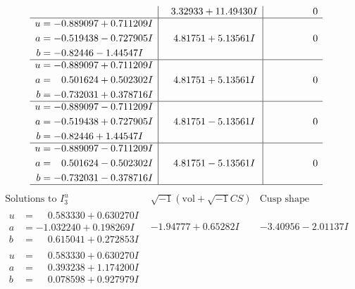 \documentclass[1p]{elsarticle_modified}
\theoremstyle{definition}
\newcommand{\I}{\sqrt{-1}}
\begin{document}
$$\begin{array}{c|c|c}
 & \phantom{-}3.32933 + 11.49430 I & \phantom{-0.000000 } 0 \\ \hline\begin{aligned}
u &= -0.889097 + 0.711209 I \\
a &= -0.519438 - 0.727905 I \\
b &= -0.82446 - 1.44547 I\end{aligned}
 & \phantom{-}4.81751 + 5.13561 I & \phantom{-0.000000 } 0 \\ \hline\begin{aligned}
u &= -0.889097 + 0.711209 I \\
a &= \phantom{-}0.501624 + 0.502302 I \\
b &= -0.732031 + 0.378716 I\end{aligned}
 & \phantom{-}4.81751 + 5.13561 I & \phantom{-0.000000 } 0 \\ \hline\begin{aligned}
u &= -0.889097 - 0.711209 I \\
a &= -0.519438 + 0.727905 I \\
b &= -0.82446 + 1.44547 I\end{aligned}
 & \phantom{-}4.81751 - 5.13561 I & \phantom{-0.000000 } 0 \\ \hline\begin{aligned}
u &= -0.889097 - 0.711209 I \\
a &= \phantom{-}0.501624 - 0.502302 I \\
b &= -0.732031 - 0.378716 I\end{aligned}
 & \phantom{-}4.81751 - 5.13561 I & \phantom{-0.000000 } 0\\
 \hline 
 \end{array}$$\newpage$$\begin{array}{c|c|c}  
\text{Solutions to }I^u_{3}& \I (\text{vol} + \sqrt{-1}CS) & \text{Cusp shape}\\
 \hline 
\begin{aligned}
u &= \phantom{-}0.583330 + 0.630270 I \\
a &= -1.032240 + 0.198269 I \\
b &= \phantom{-}0.615041 + 0.272853 I\end{aligned}
 & -1.94777 + 0.65282 I & -3.40956 - 2.01137 I \\ \hline\begin{aligned}
u &= \phantom{-}0.583330 + 0.630270 I \\
a &= \phantom{-}0.393238 + 1.174200 I \\
b &= \phantom{-}0.078598 + 0.927979 I\end{aligned}

\end{array}$$
\end{document}

